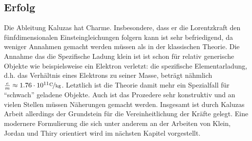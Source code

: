 \subsection{Erfolg}
Die Ableitung Kaluzas hat Charme. Insbesondere, dass er die
Lorentzkraft den fünfdimensionalen Einsteingleichungen folgern kann ist sehr 
befriedigend, da weniger Annahmen gemacht werden müssen als in der klassischen
Theorie. Die Annahme das die Spezifische Ladung klein ist ist schon für relativ
generische Objekte wie beispielsweise ein Elektron verletzt: die spezifische
Elementarladung, d.h. das Verhältnis eines Elektrons zu seiner Masse, beträgt nähmlich
$\frac{e}{m}\approx1.76\cdot10^{11}\unitfrac{C}{kg}$.
Letztlich ist die Theorie damit mehr ein Spezialfall für "`schwach"' geladene
Objekte. Auch ist das Prozedere sehr konstruktiv und an vielen Stellen müssen
Näherungen gemacht werden.
Insgesamt ist durch Kaluzas Arbeit allerdings der Grundstein für die
Vereinheitlichung der Kräfte gelegt. Eine modernere Formulierung die sich unter
anderem an der Arbeiten von Klein, Jordan und Thiry orientiert wird im nächsten
Kapitel vorgestellt.

%
%

